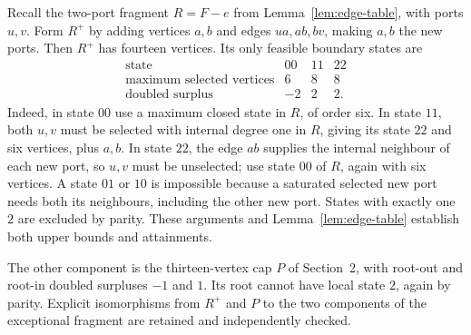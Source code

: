 \documentclass[11pt]{article}
\begin{document}
Recall the two-port fragment $R=F-e$ from
Lemma~\ref{lem:edge-table}, with ports $u,v$. Form $R^+$ by adding
vertices $a,b$ and edges $ua,ab,bv$, making $a,b$ the new ports.
Then $R^+$ has fourteen vertices. Its only feasible boundary states
are
\[
\begin{array}{c|ccc}
 \text{state}&00&11&22\\\hline
 \text{maximum selected vertices}&6&8&8\\
 \text{doubled surplus}&-2&2&2.
\end{array}
\]
Indeed, in state $00$ use a maximum closed state in $R$, of order
six. In state $11$, both $u,v$ must be selected with internal degree
one in $R$, giving its state $22$ and six vertices, plus $a,b$.
In state $22$, the edge $ab$ supplies the internal neighbour of
each new port, so $u,v$ must be unselected; use state $00$ of $R$,
again with six vertices. A state $01$ or $10$ is impossible because
a saturated selected new port needs both its neighbours, including
the other new port. States with exactly one $2$ are excluded by
parity. These arguments and Lemma~\ref{lem:edge-table} establish
both upper bounds and attainments.

The other component is the thirteen-vertex cap $P$ of Section~2,
with root-out and root-in doubled surpluses $-1$ and $1$.
Its root cannot have local state $2$, again by parity. Explicit
isomorphisms from $R^+$ and $P$ to the two components of the
exceptional fragment are retained and independently checked.
\end{document}
